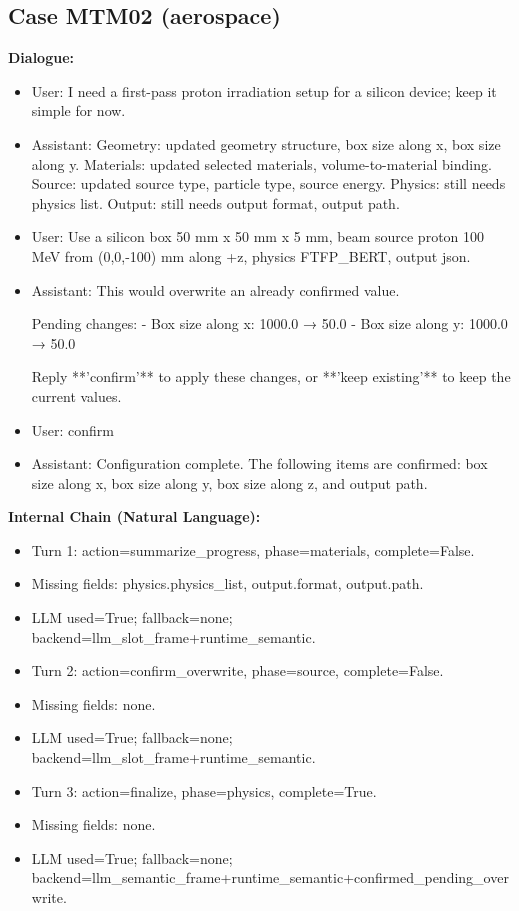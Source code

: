 \documentclass[11pt]{ctexart}
\begin{document}
\subsection{Case MTM02 (aerospace)}
\textbf{Dialogue:}
\begin{itemize}
\item User: I need a first-pass proton irradiation setup for a silicon device; keep it simple for now.
\item Assistant: Geometry: updated geometry structure, box size along x, box size along y. Materials: updated selected materials, volume-to-material binding. Source: updated source type, particle type, source energy. Physics: still needs physics list. Output: still needs output format, output path.
\item User: Use a silicon box 50 mm x 50 mm x 5 mm, beam source proton 100 MeV from (0,0,-100) mm along +z, physics FTFP\_BERT, output json.
\item Assistant: This would overwrite an already confirmed value.

Pending changes:
- Box size along x: 1000.0 → 50.0
- Box size along y: 1000.0 → 50.0

Reply **'confirm'** to apply these changes, or **'keep existing'** to keep the current values.
\item User: confirm
\item Assistant: Configuration complete. The following items are confirmed: box size along x, box size along y, box size along z, and output path.
\end{itemize}
\textbf{Internal Chain (Natural Language):}
\begin{itemize}
\item Turn 1: action=summarize\_progress, phase=materials, complete=False.
\item Missing fields: physics.physics\_list, output.format, output.path.
\item LLM used=True; fallback=none; backend=llm\_slot\_frame+runtime\_semantic.
\item Turn 2: action=confirm\_overwrite, phase=source, complete=False.
\item Missing fields: none.
\item LLM used=True; fallback=none; backend=llm\_slot\_frame+runtime\_semantic.
\item Turn 3: action=finalize, phase=physics, complete=True.
\item Missing fields: none.
\item LLM used=True; fallback=none; backend=llm\_semantic\_frame+runtime\_semantic+confirmed\_pending\_overwrite.
\end{itemize}
\end{document}
